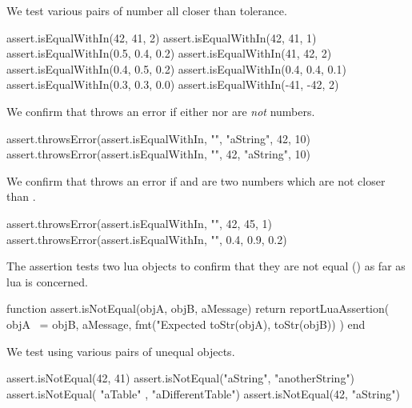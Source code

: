 
We test various pairs of number all closer than tolerance. 

\startLuaTest
  assert.isEqualWithIn(42, 41, 2)
  assert.isEqualWithIn(42, 41, 1)
  assert.isEqualWithIn(0.5, 0.4, 0.2)
  assert.isEqualWithIn(41, 42, 2)
  assert.isEqualWithIn(0.4, 0.5, 0.2)
  assert.isEqualWithIn(0.4, 0.4, 0.1)
  assert.isEqualWithIn(0.3, 0.3, 0.0)
  assert.isEqualWithIn(-41, -42, 2)
\stopLuaTest
\stopTestCase


We confirm that  throws an error if either 
 nor  are \emph{not} numbers.

\startLuaTest
  assert.throwsError(assert.isEqualWithIn, "", "aString", 42, 10)
  assert.throwsError(assert.isEqualWithIn, "", 42, "aString", 10)
\stopLuaTest
\stopTestCase


We confirm that  throws an error if  
and  are two numbers which are not closer than 
. 

\startLuaTest
  assert.throwsError(assert.isEqualWithIn, "", 42, 45, 1)
  assert.throwsError(assert.isEqualWithIn, "", 0.4, 0.9, 0.2)
\stopLuaTest
\stopTestCase

\stopTestSuite


The  assertion tests two lua objects to confirm 
that they are not equal (\type{~=}) as far as lua is concerned. 

\startLuaCode
function assert.isNotEqual(objA, objB, aMessage)
  return reportLuaAssertion(
    objA ~= objB,
    aMessage,
    fmt("Expected %
      toStr(objA), toStr(objB))
  )
end
\stopLuaCode


We test using various pairs of unequal objects.

\startLuaTest
  assert.isNotEqual(42, 41)
  assert.isNotEqual("aString", "anotherString")
  assert.isNotEqual({ "aTable" }, { "aDifferentTable"})
  assert.isNotEqual(42, "aString")
\stopLuaTest
\stopTestCase


